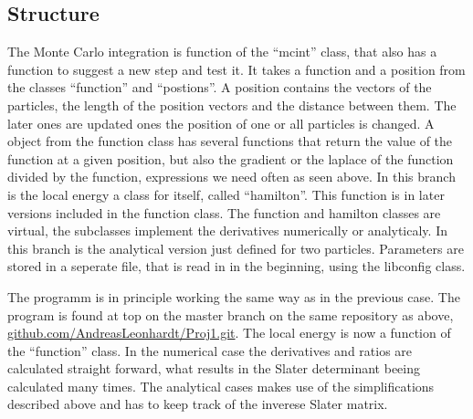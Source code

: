 \documentclass[a4paper,10pt]{article}
\begin{document}
\subsection{Structure}





The Monte Carlo integration is function of the ``mcint'' class, that also has a function to suggest a new step 
and test it. It takes a function and a position from the classes ``function'' and ``postions''. A position contains the vectors of the particles, 
the length of the position vectors and
the distance between them. The later ones are updated ones the position of one or all particles is changed. 
A object from the function class has several functions that return the value of the function at a given position, 
but also the gradient or the laplace of the function divided by the function, expressions we need often as seen above. 
In this branch is the local energy a class for itself, called ``hamilton''. This function is in later versions included in the function class.
The function and hamilton classes are virtual, the subclasses implement the derivatives numerically or analyticaly. 
In this branch is the analytical version just defined for two particles. 
Parameters are stored in a seperate file, that is read in in the beginning, using the libconfig class.

The programm is in principle working the same way as in the previous case. The program is found at top on the master branch on the same repository as above,
\href{https://github.com/AndreasLeonhardt/Proj1.git}{github.com/AndreasLeonhardt/Proj1.git}.
The local energy is now a function of the ``function'' class. 
In the numerical case the derivatives and ratios are calculated straight forward, what results in the Slater determinant beeing calculated many times.
The analytical cases makes use of the simplifications described above and has to keep track of the inverese Slater matrix. 
\end{document}
